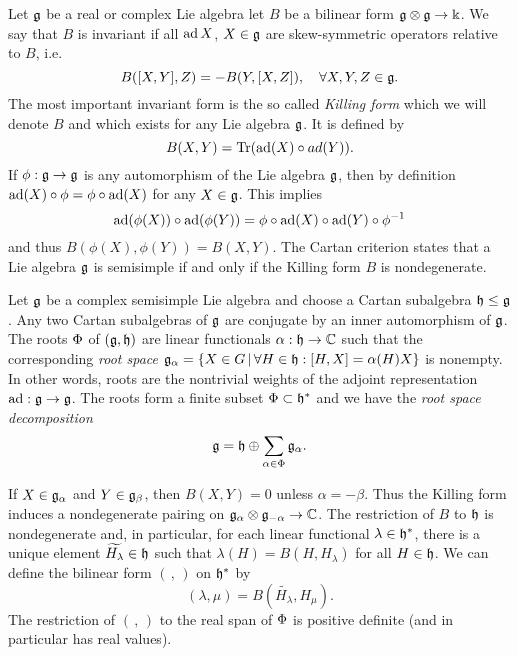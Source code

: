 Let $\mathfrak{g}$ be a real or complex Lie algebra let $B$ be a bilinear form $\mathfrak{g}\otimes \mathfrak{g} \to \Bbbk$. We say that $B$ is invariant if all $\operatorname{\mathrm{ad}} X$, $X\in\mathfrak{g}$ are skew-symmetric operators relative to $B$, i.e.
\[
 B([X,Y],Z) = -B(Y,[X,Z]), \quad \forall X,Y,Z \in \mathfrak{g}.
\]
The most important invariant form is the so called \emph{Killing form} which we will denote $B$ and which exists for any Lie algebra $\mathfrak{g}$. It is defined by
\[
 B(X,Y) = \operatorname{\mathrm{Tr}}(\operatorname{\mathrm{ad}}(X) \circ ad(Y)).
\]
If $\phi:\mathfrak{g} \to \mathfrak{g}$ is any automorphism of the Lie algebra $\mathfrak{g}$, then by definition $\operatorname{\mathrm{ad}}(X) \circ \phi = \phi \circ \operatorname{\mathrm{ad}}(X)$ for any $X\in\mathfrak{g}$. This implies
\[
 \operatorname{\mathrm{ad}}(\phi(X)) \circ \operatorname{\mathrm{ad}}(\phi(Y)) = \phi \circ \operatorname{\mathrm{ad}}(X)\circ\operatorname{\mathrm{ad}}(Y)\circ\phi^{-1}
\]
and thus $B(\phi(X),\phi(Y)) = B(X,Y)$. The Cartan criterion states that a Lie algebra $\mathfrak{g}$ is semisimple if and only if the Killing form $B$ is nondegenerate.


Let $\mathfrak{g}$ be a complex semisimple Lie algebra and choose a Cartan subalgebra $\mathfrak{h} \leq \mathfrak{g}$. Any two Cartan subalgebras of $\mathfrak{g}$ are conjugate by an inner automorphism of $\mathfrak{g}$. The roots $\Phi$ of $(\mathfrak{g},\mathfrak{h})$ are linear functionals $\alpha: \mathfrak{h} \to \mathbb{C}$ such that the corresponding \emph{root space} $\mathfrak{g}_\alpha = \{ X\in G \,|\,\forall H\in \mathfrak{h}: [H,X] = \alpha(H) X \}$ is nonempty. In other words, roots are the nontrivial weights of the adjoint representation $\operatorname{\mathrm{ad}}:\mathfrak{g}\to\mathfrak{g}$. The roots form a finite subset $\Phi \subset \mathfrak{h}^*$ and we have the \emph{root space decomposition}
\[
 \mathfrak{g} = \mathfrak{h} \oplus \sum_{\alpha \in \Phi} \mathfrak{g}_\alpha.
\]

If $X\in\mathfrak{g}_\alpha$ and $Y\in\mathfrak{g}_\beta$, then $B(X,Y) = 0$ unless $\alpha = -\beta$. Thus the Killing form induces a nondegenerate pairing on $\mathfrak{g}_\alpha \otimes \mathfrak{g}_{-\alpha}\to \mathbb{C}$. The restriction of $B$ to $\mathfrak{h}$ is nondegenerate and, in particular, for each linear functional $\lambda \in \mathfrak{h}^*$, there is a unique
 element $\widetilde{H_\lambda} \in \mathfrak{h}$ such that $\lambda(H) = B(H,H_\lambda)$ for all $H\in\mathfrak{h}$. We can define the bilinear form $(\, , \,)$ on $\mathfrak{h}^*$ by
\[
 (\lambda,\mu) = B(\widetilde{H_\lambda}, H_\mu).
\]
The restriction of $(\, , \, )$ to the real span of $\Phi$ is positive definite (and in particular has real values).

